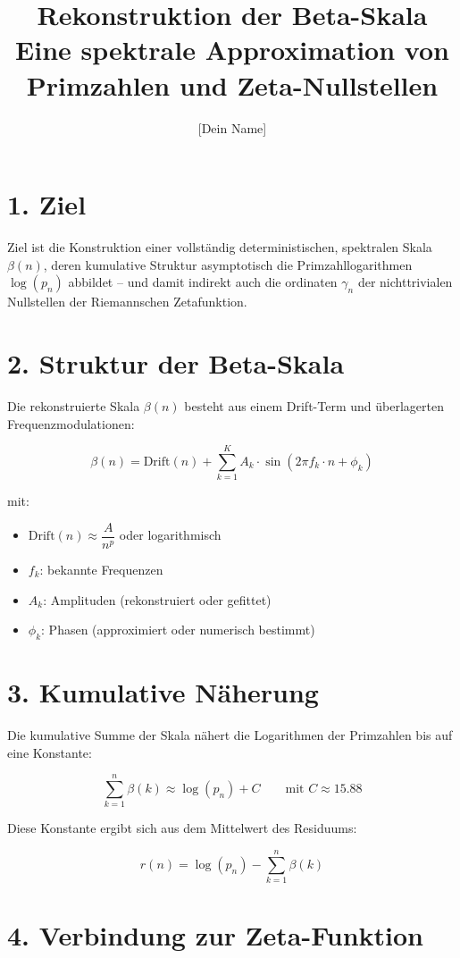 \documentclass[12pt]{article}
\title{Rekonstruktion der Beta-Skala\\
\large Eine spektrale Approximation von Primzahlen und Zeta-Nullstellen}
\author{[Dein Name]}
\date{}
\begin{document}
\maketitle

\section*{1. Ziel}
Ziel ist die Konstruktion einer vollständig deterministischen, spektralen Skala $\beta(n)$, deren kumulative Struktur asymptotisch die Primzahllogarithmen $\log(p_n)$ abbildet – und damit indirekt auch die ordinaten $\gamma_n$ der nichttrivialen Nullstellen der Riemannschen Zetafunktion.

\section*{2. Struktur der Beta-Skala}

Die rekonstruierte Skala $\beta(n)$ besteht aus einem Drift-Term und überlagerten Frequenzmodulationen:

\[
\boxed{
\beta(n) = \text{Drift}(n) + \sum_{k=1}^{K} A_k \cdot \sin(2\pi f_k \cdot n + \phi_k)
}
\]

mit:
\begin{itemize}
    \item $\text{Drift}(n) \approx \dfrac{A}{n^p}$ oder logarithmisch
    \item $f_k$: bekannte Frequenzen
    \item $A_k$: Amplituden (rekonstruiert oder gefittet)
    \item $\phi_k$: Phasen (approximiert oder numerisch bestimmt)
\end{itemize}

\section*{3. Kumulative Näherung}

Die kumulative Summe der Skala nähert die Logarithmen der Primzahlen bis auf eine Konstante:

\[
\boxed{
\sum_{k=1}^{n} \beta(k) \approx \log(p_n) + C
}
\qquad \text{mit } C \approx 15.88
\]

Diese Konstante ergibt sich aus dem Mittelwert des Residuums:

\[
r(n) = \log(p_n) - \sum_{k=1}^n \beta(k)
\]

\section*{4. Verbindung zur Zeta-Funktion}
\end{document}
